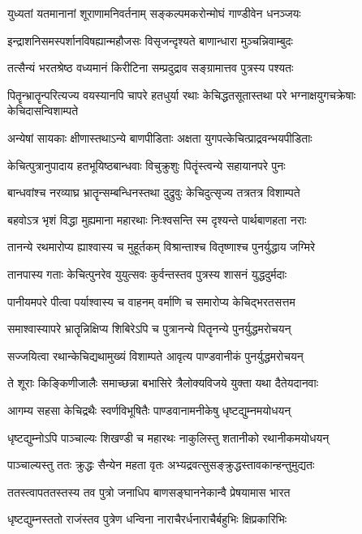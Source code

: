 \twolineshloka
{युध्यतां यतमानानां शूराणामनिवर्तनाम्}
{सङ्कल्पमकरोन्मोघं गाण्डीवेन धनञ्जयः}


\twolineshloka
{इन्द्राशनिसमस्पर्शानविषह्यान्महौजसः}
{विसृजन्दृश्यते बाणान्धारा मुञ्चन्निवाम्बुदः}


\twolineshloka
{तत्सैन्यं भरतश्रेष्ठ वध्यमानं किरीटिना}
{सम्प्रदुद्राव सङ्ग्रामात्तव पुत्रस्य पश्यतः}


पितॄन्भ्रातॄन्परित्यज्य वयस्यानपि चापरे
\twolineshloka
{हतधुर्या रथाः केचिद्धतसूतास्तथा परे}
{भग्नाक्षयुगचक्रेषाः केचिदासन्विशाम्पते}


\twolineshloka
{अन्येषां सायकाः क्षीणास्तथाऽन्ये बाणपीडिताः}
{अक्षता युगपत्केचित्प्राद्रवन्भयपीडिताः}


\twolineshloka
{केचित्पुत्रानुपादाय हतभूयिष्ठबान्धवाः}
{विचुक्रुशुः पितॄंस्त्वन्ये सहायानपरे पुनः}


\twolineshloka
{बान्धवांश्च नरव्याघ्र भ्रातॄन्सम्बन्धिनस्तथा}
{दुद्रुवुः केचिदुत्सृज्य तत्रतत्र विशाम्पते}


\twolineshloka
{बहवोऽत्र भृशं विद्धा मुह्यमाना महारथाः}
{निःश्वसन्ति स्म दृश्यन्ते पार्थबाणहता नराः}


\twolineshloka
{तानन्ये रथमारोप्य ह्याश्वास्य च मुहूर्तकम्}
{विश्रान्ताश्च वितृष्णाश्च पुनर्युद्धाय जग्मिरे}


\twolineshloka
{तानपास्य गताः केचित्पुनरेव युयुत्सवः}
{कुर्वन्तस्तव पुत्रस्य शासनं युद्धदुर्मदाः}


\twolineshloka
{पानीयमपरे पीत्वा पर्याश्वास्य च वाहनम्}
{वर्माणि च समारोप्य केचिद्भरतसत्तम}


\twolineshloka
{समाश्वास्यापरे भ्रातॄन्निक्षिप्य शिबिरेऽपि च}
{पुत्रानन्ये पितॄनन्ये पुनर्युद्धमरोचयन्}


\twolineshloka
{सज्जयित्वा रथान्केचिद्यथामुख्यं विशाम्पते}
{आवृत्य पाण्डवानीकं पुनर्युद्धमरोचयन्}


\twolineshloka
{ते शूराः किङ्किणीजालैः समाच्छन्ना बभासिरे}
{त्रैलोक्यविजये युक्ता यथा दैतेयदानवाः}


\twolineshloka
{आगम्य सहसा केचिद्रथैः स्वर्णविभूषितैः}
{पाण्डवानामनीकेषु धृष्टद्युम्नमयोधयन्}


\twolineshloka
{धृष्टद्युम्नोऽपि पाञ्चाल्यः शिखण्डी च महारथः}
{नाकुलिस्तु शतानीको रथानीकमयोधयन्}


\twolineshloka
{पाञ्चाल्यस्तु ततः क्रुद्धः सैन्येन महता वृतः}
{अभ्यद्रवत्सुसङ्क्रुद्धस्तावकान्हन्तुमुद्यतः}


\twolineshloka
{ततस्त्वापततस्तस्य तव पुत्रो जनाधिप}
{बाणसङ्घाननेकान्वै प्रेषयामास भारत}


\twolineshloka
{धृष्टद्युम्नस्ततो राजंस्तव पुत्रेण धन्विना}
{नाराचैरर्धनाराचैर्बहुभिः क्षिप्रकारिभिः}


